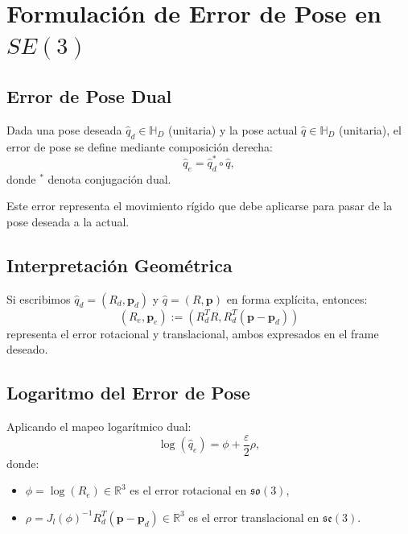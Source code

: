 \documentclass[11pt,a4paper]{article}
\begin{document}
\section{Formulación de Error de Pose en $SE(3)$}
\label{sec:pose_error}

\subsection{Error de Pose Dual}

Dada una pose deseada $\hat{q}_d \in \mathbb{H}_D$ (unitaria) y la pose actual $\hat{q} \in \mathbb{H}_D$ (unitaria), el error de pose se define mediante composición derecha:
\begin{equation}
    \hat{q}_e = \hat{q}_d^* \circ \hat{q},
\end{equation}
donde $^*$ denota conjugación dual.

Este error representa el movimiento rígido que debe aplicarse para pasar de la pose deseada a la actual.

\subsection{Interpretación Geométrica}

Si escribimos $\hat{q}_d = (R_d, \mathbf{p}_d)$ y $\hat{q} = (R, \mathbf{p})$ en forma explícita, entonces:
\begin{equation}
    (R_e, \mathbf{p}_e) := (R_d^T R, R_d^T(\mathbf{p} - \mathbf{p}_d))
\end{equation}
representa el error rotacional y translacional, ambos expresados en el frame deseado.

\subsection{Logaritmo del Error de Pose}

Aplicando el mapeo logarítmico dual:
\begin{equation}
    \log(\hat{q}_e) = \phi + \frac{\varepsilon}{2} \rho,
\end{equation}
donde:
\begin{itemize}
    \item $\phi = \log(R_e) \in \mathbb{R}^3$ es el error rotacional en $\mathfrak{so}(3)$,
    \item $\rho = J_l(\phi)^{-1} R_d^T (\mathbf{p} - \mathbf{p}_d) \in \mathbb{R}^3$ es el error translacional en $\mathfrak{se}(3)$.
\end{itemize}
\end{document}
